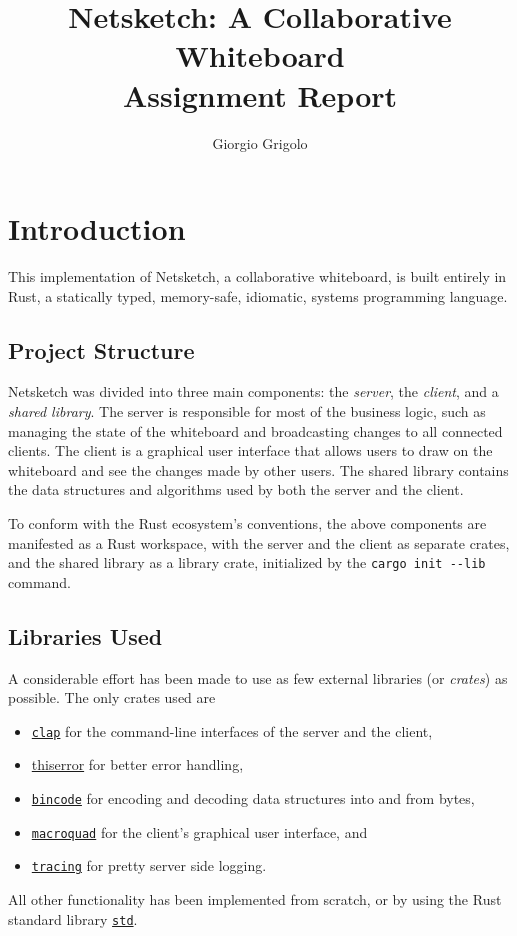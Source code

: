 \documentclass{article}
\title{Netsketch: A Collaborative Whiteboard \\ { \Large Assignment Report} }
\author{Giorgio Grigolo}
\date{}
\newcommand{\code}[1]{\texttt{#1}}
\begin{document}
\maketitle
\tableofcontents

\newpage

\section{Introduction}
This implementation of Netsketch, a collaborative whiteboard, is built entirely in Rust, a statically typed, memory-safe, idiomatic, systems programming language.

\subsection{Project Structure}
Netsketch was divided into three main components: the \textit{server}, the \textit{client}, and a \textit{shared library}. The server is responsible for most of the business logic, such as managing the state of the whiteboard and broadcasting changes to all connected clients. The client is a graphical user interface that allows users to draw on the whiteboard and see the changes made by other users. The shared library contains the data structures and algorithms used by both the server and the client.

To conform with the Rust ecosystem's conventions, the above components are manifested as a Rust workspace, with the server and the client as separate crates, and the shared library as a library crate, initialized by the \code{cargo init {-}{-}lib} command.

\subsection{Libraries Used}
A considerable effort has been made to use as few external libraries (or
\textit{crates}) as possible. The only crates used are
\begin{itemize}
    \item \href{https://docs.rs/clap/latest/clap/}{\code{clap}} for the command-line interfaces of the server and the client,
    \item \href{https://docs.rs/thiserror/latest/thiserror/}{thiserror} for better error handling,
    \item \href{https://docs.rs/bincode/latest/bincode/}{\code{bincode}} for encoding and decoding data structures into and from bytes,
    \item \href{https://docs.rs/macroquad/latest/macroquad/}{\code{macroquad}} for the client's graphical user interface, and
    \item \href{https://docs.rs/tracing/latest/tracing/}{\code{tracing}} for pretty server side logging.
\end{itemize}
All other functionality has been implemented from scratch, or by using the Rust standard library \href{https://doc.rust-lang.org/std/}{\code{std}}.
\end{document}
